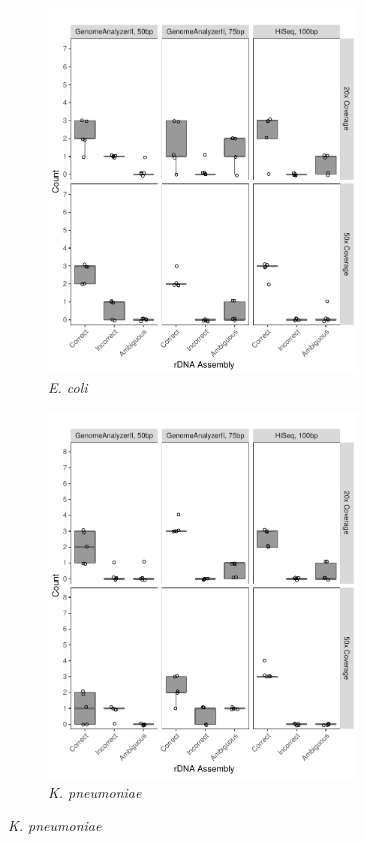 \documentclass[10pt]{article}
\begin{document}
\begin{linenumbers}
\begin{figure}[!h]
  \centering
  \begin{subfigure}[b]{0.45\textwidth}
    \includegraphics[width=0.9\textwidth]{coli}
    \caption{\textit{E. coli}}
    \label{fig:sim_coli}
  \end{subfigure}
  \begin{subfigure}[b]{0.45\textwidth}
    \includegraphics[width=0.9\textwidth]{kleb}
    \caption{\textit{K. pneumoniae}}
    \label{fig:sim_kleb}
  \end{subfigure}


\end{figure}
\end{linenumbers}
\end{document}
